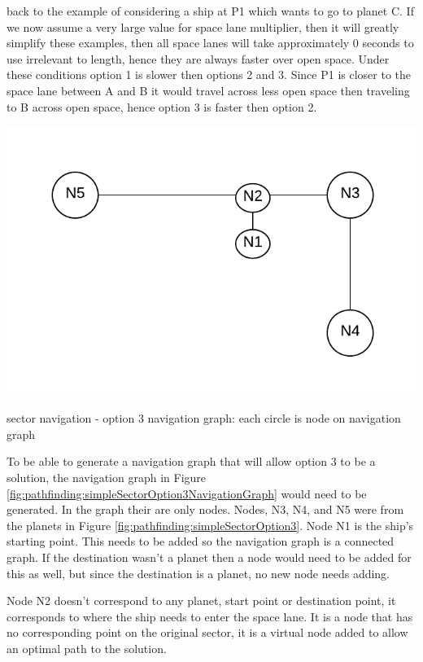 back to the example of considering a ship at P1 which wants to go to planet C.
If we now assume a very large value for space lane multiplier, then it will greatly simplify these examples, then all space lanes will take approximately 0 seconds to use irrelevant to length, hence they are always faster over open space.
Under these conditions option 1 is slower then options 2 and 3.
Since P1 is closer to the space lane between A and B it would travel across less open space then traveling to B across open space, hence option 3 is faster then option 2.

\begin{marginfigure}
	\includegraphics{res/pathfinding/PathFindingSectorOption3NavigationGraph.pdf}
    \caption[sector navigation - option 3 navigation graph]{sector navigation - option 3 navigation graph: each circle is node on navigation graph}
	\label{fig:pathfinding:simpleSectorOption3NavigationGraph}
\end{marginfigure}

To be able to generate a navigation graph that will allow option 3 to be a solution, the navigation graph in Figure \ref{fig:pathfinding:simpleSectorOption3NavigationGraph} would need to be generated.
In the graph their are only nodes. 
Nodes, N3, N4, and N5 were from the planets in Figure \ref{fig:pathfinding:simpleSectorOption3}.
Node N1 is the ship's starting point.
This needs to be added so the navigation graph is a connected graph.
If the destination wasn't a planet then a node would need to be added for this as well, but since the destination is a planet, no new node needs adding.

Node N2 doesn't correspond to any planet, start point or destination point, it corresponds to where the ship needs to enter the space lane.
It is a node that has no corresponding point on the original sector, it is a virtual node added to allow an optimal path to the solution.


